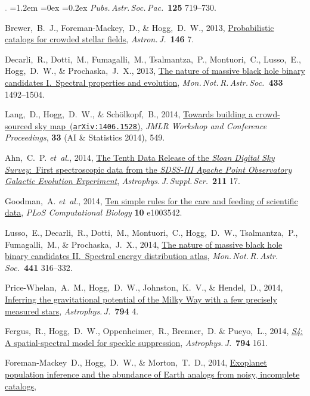 \documentclass[10pt,letterpaper]{article}
\newcommand{\acronym}[1]{{\small{#1}}}
\newcommand{\foreign}[1]{\textsl{#1}}
\newcommand{\etal}{\foreign{et~al.}}
\newcommand{\project}[1]{\textsl{#1}}
\newcommand{\doi}[2]{\href{http://dx.doi.org/#1}{{#2}}}
\newcommand{\arxiv}[2]{\href{http://arxiv.org/abs/#1}{{#2}\ (\texttt{arXiv:#1})}}
\newcommand{\deemph}[1]{\textcolor{grey}{\footnotesize{#1}}}
\newcommand{\pubnumber}[1]{\deemph{{#1}.}}
\newcounter{refpubnum}
\newcommand{\hogglist}{%
    \rightmargin=0in
    \leftmargin=1.2em
    \topsep=0ex
    \partopsep=0pt
    \itemsep=0.2ex
    \parsep=0pt
    \itemindent=-1.0\leftmargin
    \listparindent=0.0\leftmargin
    \settowidth{\labelsep}{~}
    \usecounter{refpubnum}
  }
\begin{document}
\begin{list}{\pubnumber{\therefpubnum}}{\hogglist}
\textit{Pubs.\,Astr.\,Soc.\,Pac.}\ \textbf{125} 719--730.
\item
Brewer,~B.~J., Foreman-Mackey,~D., \& Hogg,~D.~W., 2013,
\doi{10.1088/0004-6256/146/1/7}{Probabilistic catalogs for crowded stellar fields},
\textit{Astron.\,J.}\ \textbf{146} 7.
\item
Decarli,~R., Dotti,~M., Fumagalli,~M., Tsalmantza,~P., Montuori,~C., Lusso,~E.,
Hogg,~D.~W., \& Prochaska,~J.~X., 2013,
\doi{10.1093/mnras/stt831}{The nature of massive black hole binary candidates \acronym{I}.\ Spectral properties and evolution},
\textit{Mon.\,Not.\,R.\,Astr.\,Soc.}\ \textbf{433} 1492--1504.
\item
Lang,~D., Hogg,~D.~W., \& Sch\"olkopf,~B., 2014,
\arxiv{1406.1528}{Towards building a crowd-sourced sky map},
\textit{JMLR Workshop and Conference Proceedings}, \textbf{33} (AI \& Statistics 2014), 549.
\item
Ahn,~C.~P. \etal, 2014,
\doi{10.1088/0067-0049/211/2/17}{The Tenth Data Release of the \project{Sloan Digital Sky Survey}:\ First spectroscopic data from the \project{\acronym{SDSS-III} Apache Point Observatory Galactic Evolution Experiment}},
\textit{Astrophys.\,J.\,Suppl.\,Ser.}\ \textbf{211} 17.
\item
Goodman,~A. \etal, 2014,
\doi{10.1371/journal.pcbi.1003542}{Ten simple rules for the care and feeding of scientific data},
\textit{PLoS Computational Biology} \textbf{10} e1003542.
\item
Lusso,~E., Decarli,~R., Dotti,~M., Montuori,~C., Hogg,~D.~W.,
Tsalmantza,~P., Fumagalli,~M., \& Prochaska,~J.~X., 2014,
\doi{10.1093/mnras/stu572}{The nature of massive black hole binary candidates \acronym{II}.\ Spectral energy distribution atlas},
\textit{Mon.\,Not.\,R.\,Astr.\,Soc.}\ \textbf{441} 316--332.
\item
Price-Whelan,~A.~M., Hogg,~D.~W., Johnston,~K.~V., \& Hendel,~D., 2014,
\doi{10.1088/0004-637X/794/1/4}{Inferring the gravitational potential of the Milky Way with a few precisely measured stars},
\textit{Astrophys.\,J.}\ \textbf{794} 4.
\item
Fergus,~R., Hogg,~D.~W., Oppenheimer,~R., Brenner,~D. \& Pueyo,~L., 2014,
\doi{10.1088/0004-637X/794/2/161}{\project{S4}: A spatial-spectral model for speckle suppression},
\textit{Astrophys.\,J.}\ \textbf{794} 161.
\item
Foreman-Mackey~D., Hogg,~D.~W., \& Morton,~T.~D., 2014,
\doi{10.1088/0004-637X/795/1/64}{Exoplanet population inference and the abundance of Earth analogs from noisy, incomplete catalogs},

\end{list}
\end{document}
